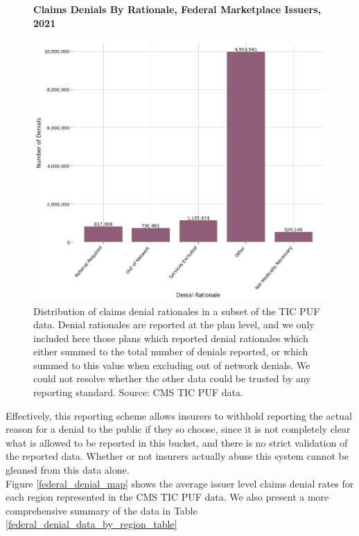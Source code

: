 \documentclass[12pt, a4paper]{report}
\begin{document}
\begin{figure}
	\centering
	\textbf{Claims Denials By Rationale, Federal Marketplace Issuers, 2021}\par\medskip
	\includegraphics[width=0.85\columnwidth]{images/cms_puf/denials_by_rationale.png}
	\caption{Distribution of claims denial rationales in a subset of the TIC PUF data. Denial rationales are reported at the plan level, and we only included here those plans which reported denial rationales which either summed to the total number of denials reported, or which summed to this value when excluding out of network denials. We could not resolve whether the other data could be trusted by any reporting standard. Source: CMS TIC PUF data.}
	\label{federal_denials_by_rationale}
\end{figure}

Effectively, this reporting scheme allows insurers to withhold reporting the actual reason for a denial to the public if they so choose, since it is not completely clear what is allowed to be reported in this bucket, and there is no strict validation of the reported data. Whether or not insurers actually abuse this system cannot be gleaned from this data alone.\\


Figure \ref{federal_denial_map} shows the average issuer level claims denial rates for each region represented in the CMS TIC PUF data. We also present a more comprehensive summary of the data in Table \ref{federal_denial_data_by_region_table}\\
\end{document}
